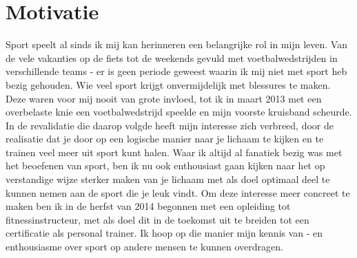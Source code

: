 \documentclass[11pt,a4paper,sans]{moderncv} %
\begin{document}
\section{Motivatie}
Sport speelt al sinds ik mij kan herinneren een belangrijke rol in mijn
leven. Van de vele vakanties op de fiets tot de weekends gevuld met
voetbalwedstrijden in verschillende teams - er is geen periode geweest
waarin ik mij niet met sport heb bezig gehouden. Wie veel sport krijgt onvermijdelijk met blessures te maken. Deze waren voor mij nooit 
van grote invloed,
tot ik in maart 2013 met een overbelaste knie een voetbalwedstrijd speelde
en mijn voorste kruisband scheurde. In de revalidatie die daarop volgde
heeft mijn interesse zich verbreed, door de realisatie dat je
door op een logische manier naar je lichaam 
te kijken en te trainen veel meer uit
sport kunt halen. Waar ik altijd al fanatiek bezig was met het beoefenen
van sport, ben ik nu ook enthousiast gaan kijken naar het op verstandige
wijze sterker maken van je lichaam met als doel optimaal deel te kunnen
nemen aan de sport die je leuk vindt. Om deze interesse meer
concreet te maken ben ik in de herfst van 2014 begonnen met een opleiding
tot fitnessinstructeur, met als doel dit in de toekomst uit te breiden
tot een certificatie als personal trainer. Ik hoop op die manier mijn
kennis van - en enthousiasme over sport op andere mensen te kunnen overdragen.
\end{document}
